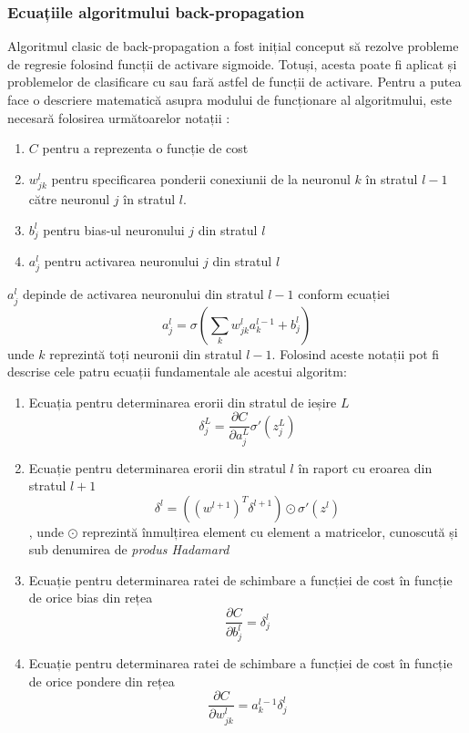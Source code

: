 \subsubsection*{Ecuațiile algoritmului back-propagation}
Algoritmul clasic de back-propagation a fost inițial conceput să rezolve probleme de regresie folosind funcții de activare sigmoide. Totuși, acesta poate fi aplicat și problemelor de clasificare cu sau fară astfel de funcții de activare. Pentru a putea face o descriere matematică asupra modului de funcționare al algoritmului, este necesară folosirea următoarelor notații \cite{neuralnetbook:2015}:
\begin{enumerate}
\item $C$ pentru a reprezenta o funcție de cost
\item $w_{jk}^l$ pentru specificarea ponderii conexiunii de la neuronul $k$ în stratul $l-1$ către neuronul $j$ în stratul $l$.
\item $b_j^l$ pentru bias-ul neuronului $j$ din stratul $l$
\item $a_j^l$ pentru activarea neuronului $j$ din stratul $l$
\end{enumerate}
$a_j^l$ depinde de activarea neuronului din stratul $l-1$ conform ecuației
\begin{equation}
a_j^l=\sigma(\sum_k w_{jk}^l a_k^{l-1} + b_j^l)
\end{equation}
unde $k$ reprezintă toți neuronii din stratul $l-1$. Folosind aceste notații pot fi descrise cele patru ecuații fundamentale ale acestui algoritm:
\begin{enumerate}
\item Ecuația pentru determinarea erorii din stratul de ieșire $L$
\begin{equation}
\delta_j^L=\frac{\partial C}{\partial a_j^L}\sigma'(z_j^L)
\label{eq:out-err}
\end{equation}
\item Ecuație pentru determinarea erorii din stratul $l$ în raport cu eroarea din stratul $l+1$
\begin{equation}
\delta^l = ((w^{l+1})^T \delta^{l+1}) \odot \sigma'(z^l)
\label{eq:back-prop-err}
\end{equation}
, unde $\odot$ reprezintă înmulțirea element cu element a matricelor, cunoscută și sub denumirea de \textit{produs Hadamard}
\item Ecuație pentru determinarea ratei de schimbare a funcției de cost în funcție de orice bias din rețea
\begin{equation}
\frac{\partial C}{\partial b^l_j} = \delta^l_j
\label{eq:cost-w}
\end{equation}
\item Ecuație pentru determinarea ratei de schimbare a funcției de cost în funcție de orice pondere din rețea
\begin{equation}
\frac{\partial C}{\partial w^l_{jk}} = a^{l-1}_k \delta^l_j
\label{eq:cost-b}
\end{equation}
\end{enumerate}

